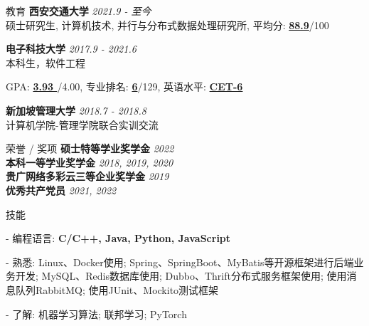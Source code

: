 \documentclass{resume} %
\begin{document}

\begin{rSection}{教育}
{\textbf{西安交通大学}} \hfill {\em 2021.9 - 至今} \\ 
硕士研究生, 计算机技术, 并行与分布式数据处理研究所, 平均分: \textbf{\underline{88.9}}/100

{\textbf{电子科技大学}} \hfill {\em 2017.9 - 2021.6} \\
本科生，软件工程
\begin{rSubsection}{}{}{}{}
\item GPA: \textbf{\underline{ 3.93 }}/4.00, 专业排名: \textbf{\underline{6}}/129, 英语水平: \textbf{\underline{CET-6}}
\end{rSubsection}

{\textbf{新加坡管理大学}} \hfill {\em 2018.7 - 2018.8} \\ 
计算机学院-管理学院联合实训交流

\end{rSection}


\begin{rSection}{荣誉 / 奖项}
    {\textbf{硕士特等学业奖学金}} \hfill {\em 2022} \\
    {\textbf{本科一等学业奖学金}} \hfill {\em 2018, 2019, 2020} \\
    {\textbf{贵广网络多彩云三等企业奖学金}} \hfill {\em 2019} \\
    {\textbf{优秀共产党员}} \hfill {\em 2021, 2022}
\end{rSection}


\begin{rSection}{技能}
    \begin{rSubsection}
    {}{}{}{}
    \item[-] 编程语言: \textbf{C/C++, Java, Python, JavaScript}
    \item[-] 熟悉: Linux、Docker使用; Spring、SpringBoot、MyBatis等开源框架进行后端业务开发; MySQL、Redis数据库使用; Dubbo、Thrift分布式服务框架使用; 使用消息队列RabbitMQ; 使用JUnit、Mockito测试框架
    \item[-] 了解: 机器学习算法; 联邦学习; PyTorch
    \end{rSubsection}
\end{rSection}
    
\end{document}
